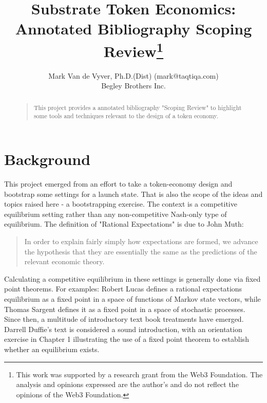 \documentclass[11pt]{article}
\begin{document}


\title{Substrate Token Economics:\\Annotated Bibliography Scoping Review\footnote{This work was supported by a research grant from the Web3 Foundation. The analysis and opinions expressed are the author's and do not reflect the opinions of the Web3 Foundation.}}
\author{Mark Van de Vyver, Ph.D.(Dist) (mark@taqtiqa.com)\\
Begley Brothers Inc.\\
}
\maketitle
\begin{abstract}
\begin{quote}
This project provides a annotated bibliography "Scoping Review" to highlight some tools and techniques relevant to the design of a token economy.
\end{quote}
\end{abstract}

\tableofcontents

\section{Background}
This project emerged from an effort to take a token-economy design and bootstrap some settings for a launch state. That is also the scope of the ideas and topics raised here - a bootstrapping exercise.  The context is a competitive equilibrium setting rather than any non-competitive Nash-only type of equilibrium.
The definition of "Rational Expectations" is due to John Muth\autocite{muth61}:
\begin{quote}
In order to explain fairly simply how expectations are formed, we advance the hypothesis that they are essentially the same as the predictions of the relevant economic theory.
\end{quote}
Calculating a competitive equilibrium in these settings is generally done via fixed point theorems.  For examples: Robert Lucas\autocite{lucas72} defines a rational expectations equilibrium as a fixed point in a space of functions of Markov state vectors, while Thomas Sargent\autocite{sargent71} defines it as a fixed point in a space of stochastic processes. Since then, a multitude of introductory text book treatments have emerged. Darrell Duffie's text\autocite{duffie01} is considered a sound introduction, with an orientation exercise in Chapter 1 illustrating the use of a fixed point theorem to establish whether an equilibrium exists.
\end{document}
